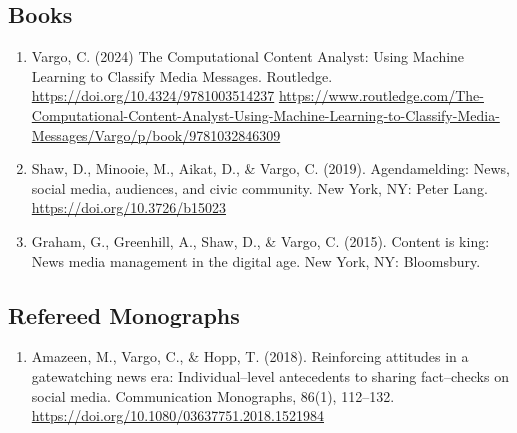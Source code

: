 \documentclass[11pt,letterpaper]{article}
\begin{document}
\subsection*{Books}
{\small
\begin{enumerate}
\item Vargo, C. (2024) The Computational Content Analyst: Using Machine Learning to Classify Media Messages. Routledge. \url{https://doi.org/10.4324/9781003514237} \url{https://www.routledge.com/The-Computational-Content-Analyst-Using-Machine-Learning-to-Classify-Media-Messages/Vargo/p/book/9781032846309}
\item Shaw, D., Minooie, M., Aikat, D., \& Vargo, C. (2019). Agendamelding: News, social media, audiences, and civic community. New York, NY: Peter Lang. \url{https://doi.org/10.3726/b15023}
\item Graham, G., Greenhill, A., Shaw, D., \& Vargo, C. (2015). Content is king: News media management in the digital age. New York, NY: Bloomsbury.
\end{enumerate}
}
\subsection*{Refereed Monographs}
{\small
\begin{enumerate}
\item Amazeen, M., Vargo, C., \& Hopp, T. (2018). Reinforcing attitudes in a gatewatching news era: Individual--level antecedents to sharing fact--checks on social media. Communication Monographs, 86(1), 112--132. \url{https://doi.org/10.1080/03637751.2018.1521984}
\end{enumerate}
}
\end{document}
